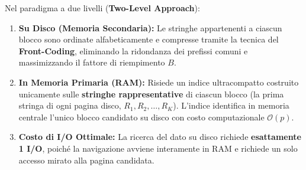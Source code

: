 Nel paradigma a due livelli (\textbf{Two-Level Approach}):
\begin{enumerate}
  \item \textbf{Su Disco (Memoria Secondaria):} Le stringhe appartenenti a ciascun blocco sono ordinate alfabeticamente e compresse tramite la tecnica del \textbf{Front-Coding}, eliminando la ridondanza dei prefissi comuni e massimizzando il fattore di riempimento $B$.
  \item \textbf{In Memoria Primaria (RAM):} Risiede un indice ultracompatto costruito unicamente sulle \textbf{stringhe rappresentative} di ciascun blocco (la prima stringa di ogni pagina disco, $R_1, R_2, \dots, R_K$). L'indice identifica in memoria centrale l'unico blocco candidato su disco con costo computazionale $\mathcal{O}(p)$.
  \item \textbf{Costo di I/O Ottimale:} La ricerca del dato su disco richiede \textbf{esattamente 1 I/O}, poich\'e la navigazione avviene interamente in RAM e richiede un solo accesso mirato alla pagina candidata.
\end{enumerate}


